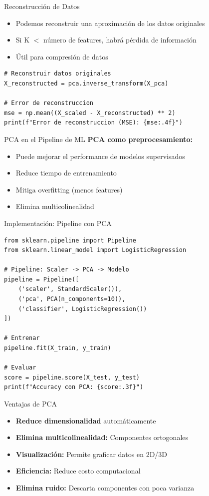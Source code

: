 \documentclass{beamer}
\begin{document}
\begin{frame}[fragile]{Reconstrucción de Datos}
    \begin{itemize}
        \item Podemos reconstruir una aproximación de los datos originales
        \item Si K $<$ número de features, habrá pérdida de información
        \item Útil para compresión de datos
    \end{itemize}
    \vspace{0.5em}
    \begin{lstlisting}
# Reconstruir datos originales
X_reconstructed = pca.inverse_transform(X_pca)

# Error de reconstruccion
mse = np.mean((X_scaled - X_reconstructed) ** 2)
print(f"Error de reconstruccion (MSE): {mse:.4f}")
    \end{lstlisting}
\end{frame}

\begin{frame}{PCA en el Pipeline de ML}
    \textbf{PCA como preprocesamiento:}
    \begin{itemize}
        \item Puede mejorar el performance de modelos supervisados
        \item Reduce tiempo de entrenamiento
        \item Mitiga overfitting (menos features)
        \item Elimina multicolinealidad
    \end{itemize}
\end{frame}

\begin{frame}[fragile]{Implementación: Pipeline con PCA}
    \begin{lstlisting}
from sklearn.pipeline import Pipeline
from sklearn.linear_model import LogisticRegression

# Pipeline: Scaler -> PCA -> Modelo
pipeline = Pipeline([
    ('scaler', StandardScaler()),
    ('pca', PCA(n_components=10)),
    ('classifier', LogisticRegression())
])

# Entrenar
pipeline.fit(X_train, y_train)

# Evaluar
score = pipeline.score(X_test, y_test)
print(f"Accuracy con PCA: {score:.3f}")
    \end{lstlisting}
\end{frame}

\begin{frame}{Ventajas de PCA}
    \begin{itemize}
        \item \textbf{Reduce dimensionalidad} automáticamente
        \item \textbf{Elimina multicolinealidad:} Componentes ortogonales
        \item \textbf{Visualización:} Permite graficar datos en 2D/3D
        \item \textbf{Eficiencia:} Reduce costo computacional
        \item \textbf{Elimina ruido:} Descarta componentes con poca varianza
    \end{itemize}
\end{frame}
\end{document}
